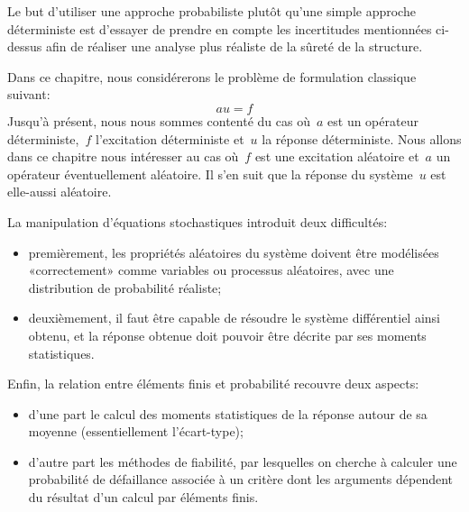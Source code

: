 Le but d'utiliser une approche probabiliste plutôt qu'une simple approche déterministe est d'essayer de prendre en compte les incertitudes mentionnées ci-dessus afin de réaliser une analyse plus réaliste de la sûreté de la structure.

\medskip
Dans ce chapitre, nous considérerons le problème de formulation classique suivant:
\begin{equation}\label{Eq-Sto1}
au=f
\end{equation}
Jusqu'à présent, nous nous sommes contenté du cas où~$a$ est un opérateur déterministe,~$f$ l'excitation déterministe et~$u$ la réponse déterministe.
Nous allons dans ce chapitre nous intéresser au cas où~$f$ est une excitation aléatoire et~$a$ un opérateur éventuellement aléatoire. Il s'en suit que la réponse du système~$u$ est elle-aussi aléatoire.

\medskip
La manipulation d'équations stochastiques introduit deux difficultés:
\begin{itemize}
   \item premièrement, les propriétés aléatoires du système doivent être modélisées «correctement» comme variables ou processus aléatoires, avec une distribution de probabilité réaliste;
   \item deuxièmement, il faut être capable de résoudre le système différentiel ainsi obtenu, et la réponse obtenue doit pouvoir être décrite par ses moments statistiques.
\end{itemize}

\medskip
Enfin, la relation entre éléments finis et probabilité recouvre deux aspects:
\begin{itemize}
   \item d'une part le calcul des moments statistiques de la réponse autour de sa moyenne (essentiellement l'écart-type);
   \item d'autre part les méthodes de fiabilité, par lesquelles on cherche à calculer une probabilité de défaillance associée à un critère dont les arguments dépendent du résultat d'un calcul par éléments finis.
\end{itemize}


